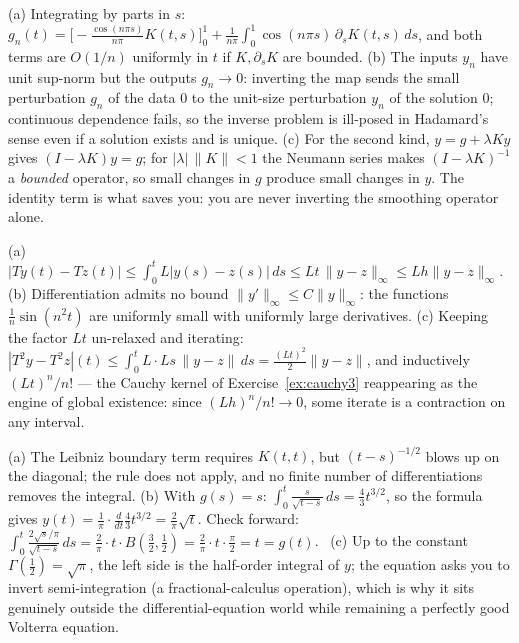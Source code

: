 \documentclass{essay}
\begin{document}
\begin{description}[leftmargin=0pt, itemsep=6pt]
\item[\ref{ex:illposed}.] (a) Integrating by parts in $s$: $g_n(t) = \bigl[-\tfrac{\cos(n\pi s)}{n\pi}K(t,s)\bigr]_0^1 + \tfrac{1}{n\pi}\int_0^1 \cos(n\pi s)\,\partial_s K(t,s)\,ds$, and both terms are $O(1/n)$ uniformly in $t$ if $K, \partial_s K$ are bounded. (b) The inputs $y_n$ have unit sup-norm but the outputs $g_n \to 0$: inverting the map sends the small perturbation $g_n$ of the data $0$ to the unit-size perturbation $y_n$ of the solution $0$; continuous dependence fails, so the inverse problem is ill-posed in Hadamard's sense even if a solution exists and is unique. (c) For the second kind, $y = g + \lambda K y$ gives $(I - \lambda K)y = g$; for $|\lambda|\,\|K\| < 1$ the Neumann series makes $(I - \lambda K)^{-1}$ a \emph{bounded} operator, so small changes in $g$ produce small changes in $y$. The identity term is what saves you: you are never inverting the smoothing operator alone.

\item[\ref{ex:contraction}.] (a) $|Ty(t) - Tz(t)| \le \int_0^t L|y(s)-z(s)|\,ds \le Lt\,\|y - z\|_\infty \le Lh\|y-z\|_\infty$. (b) Differentiation admits no bound $\|y'\|_\infty \le C\|y\|_\infty$: the functions $\tfrac1n\sin(n^2 t)$ are uniformly small with uniformly large derivatives. (c) Keeping the factor $Lt$ un-relaxed and iterating: $|T^2y - T^2z|(t) \le \int_0^t L \cdot Ls\,\|y-z\|\,ds = \tfrac{(Lt)^2}{2}\|y-z\|$, and inductively $(Lt)^n/n!$ --- the Cauchy kernel of Exercise~\ref{ex:cauchy3} reappearing as the engine of global existence: since $(Lh)^n/n! \to 0$, some iterate is a contraction on any interval.

\item[\ref{ex:abel}.] (a) The Leibniz boundary term requires $K(t,t)$, but $(t-s)^{-1/2}$ blows up on the diagonal; the rule does not apply, and no finite number of differentiations removes the integral. (b) With $g(s) = s$: $\int_0^t \frac{s}{\sqrt{t-s}}\,ds = \tfrac{4}{3}t^{3/2}$, so the formula gives $y(t) = \tfrac{1}{\pi}\cdot\tfrac{d}{dt}\tfrac{4}{3}t^{3/2} = \tfrac{2}{\pi}\sqrt{t}$. Check forward: $\int_0^t \frac{2\sqrt{s}/\pi}{\sqrt{t-s}}\,ds = \tfrac{2}{\pi}\cdot t \cdot B(\tfrac32, \tfrac12) = \tfrac{2}{\pi} \cdot t \cdot \tfrac{\pi}{2} = t = g(t)$. \checkmark\ (c) Up to the constant $\Gamma(\tfrac12) = \sqrt{\pi}$, the left side is the half-order integral of $y$; the equation asks you to invert semi-integration (a fractional-calculus operation), which is why it sits genuinely outside the differential-equation world while remaining a perfectly good Volterra equation.

\end{description}
\end{document}
